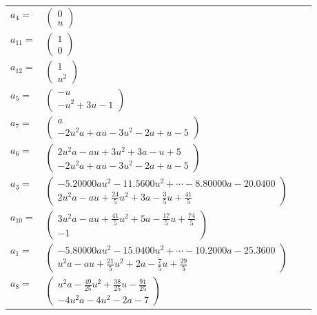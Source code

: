 \documentclass[1p]{elsarticle_modified}
\theoremstyle{definition}
\begin{document}
\begin{tabular}{m{7pt} m{180pt} m{7pt} m{180pt} }
\flushright $a_{4}=$&$\begin{pmatrix}0\\u\end{pmatrix}$ \\
\flushright $a_{11}=$&$\begin{pmatrix}1\\0\end{pmatrix}$ \\
\flushright $a_{12}=$&$\begin{pmatrix}1\\u^2\end{pmatrix}$ \\
\flushright $a_{5}=$&$\begin{pmatrix}- u\\- u^2+3 u-1\end{pmatrix}$ \\
\flushright $a_{7}=$&$\begin{pmatrix}a\\-2 u^2 a+a u-3 u^2-2 a+u-5\end{pmatrix}$ \\
\flushright $a_{6}=$&$\begin{pmatrix}2 u^2 a- a u+3 u^2+3 a- u+5\\-2 u^2 a+a u-3 u^2-2 a+u-5\end{pmatrix}$ \\
\flushright $a_{3}=$&$\begin{pmatrix}-5.20000 a u^{2}-11.5600 u^{2}+\cdots-8.80000 a-20.0400\\2 u^2 a- a u+\frac{24}{5} u^2+3 a-\frac{3}{5} u+\frac{41}{5}\end{pmatrix}$ \\
\flushright $a_{10}=$&$\begin{pmatrix}3 u^2 a- a u+\frac{41}{5} u^2+5 a-\frac{17}{5} u+\frac{74}{5}\\-1\end{pmatrix}$ \\
\flushright $a_{1}=$&$\begin{pmatrix}-5.80000 a u^{2}-15.0400 u^{2}+\cdots-10.2000 a-25.3600\\u^2 a- a u+\frac{21}{5} u^2+2 a-\frac{7}{5} u+\frac{29}{5}\end{pmatrix}$ \\
\flushright $a_{8}=$&$\begin{pmatrix}u^2 a-\frac{49}{25} u^2+\frac{38}{25} u-\frac{91}{25}\\-4 u^2 a-4 u^2-2 a-7\end{pmatrix}$ \\

\end{tabular}
\end{document}
